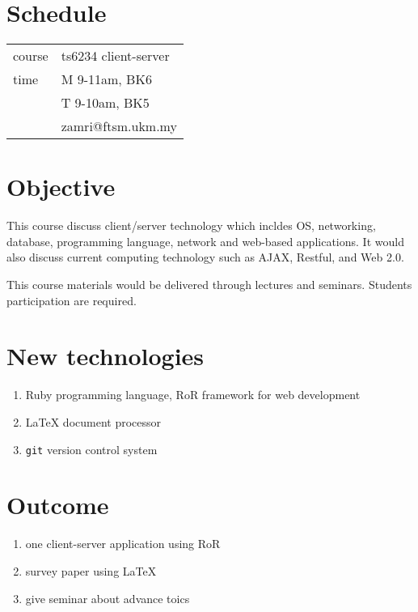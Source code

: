\documentclass[a4paper,12pt]{article}
\begin{document}
\section{Schedule}
	\begin{tabular}{ll}
		course & ts6234 client-server \\
		time & M 9-11am, BK6 \\
			 & T 9-10am, BK5 \\
			 & zamri@ftsm.ukm.my
	\end{tabular}
			 
\section{Objective}
This course discuss client/server technology which incldes OS, networking, database, programming language, network and web-based applications. It would also discuss current computing technology such as AJAX, Restful, and Web 2.0.

This course materials would be delivered through lectures and seminars. Students participation are required.

\section{New technologies}
\begin{enumerate}
\item Ruby programming language, RoR framework for web development
\item \LaTeX{} document processor
\item \verb|git| version control system
\end{enumerate}

\section{Outcome}
\begin{enumerate}
	\item one client-server application using RoR
	\item survey paper using \LaTeX{}
	\item give seminar about advance toics
\end{enumerate}
\end{document}
